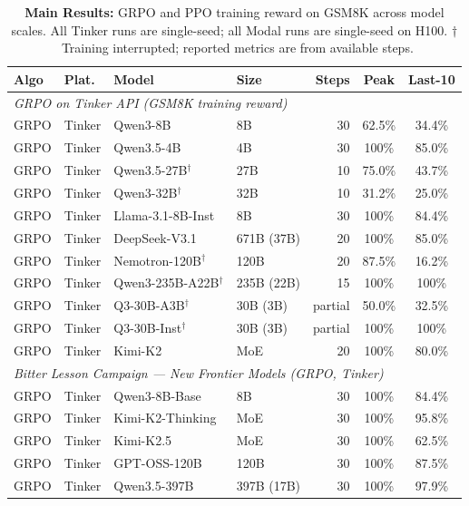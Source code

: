 \documentclass{article}
\begin{document}
\begin{table}[t]
\centering
\caption{\textbf{Main Results:} GRPO and PPO training reward on GSM8K across model scales.
All Tinker runs are single-seed; all Modal runs are single-seed on H100.
$\dagger$~Training interrupted; reported metrics are from available steps.}
\label{tab:main_results}
\scriptsize
\setlength{\tabcolsep}{3pt}
\begin{tabular}{@{}l l l l r c c@{}}
\toprule
\textbf{Algo} & \textbf{Plat.} & \textbf{Model} & \textbf{Size} & \textbf{Steps} & \textbf{Peak} & \textbf{Last-10} \\
\midrule
\multicolumn{7}{l}{\textit{GRPO on Tinker API (GSM8K training reward)}} \\
\midrule
GRPO & Tinker & Qwen3-8B & 8B & 30 & 62.5\% & 34.4\% \\
GRPO & Tinker & Qwen3.5-4B & 4B & 30 & 100\% & 85.0\% \\
GRPO & Tinker & Qwen3.5-27B$^\dagger$ & 27B & 10 & 75.0\% & 43.7\% \\
GRPO & Tinker & Qwen3-32B$^\dagger$ & 32B & 10 & 31.2\% & 25.0\% \\
GRPO & Tinker & Llama-3.1-8B-Inst & 8B & 30 & 100\% & 84.4\% \\
GRPO & Tinker & DeepSeek-V3.1 & 671B (37B) & 20 & 100\% & 85.0\% \\
GRPO & Tinker & Nemotron-120B$^\dagger$ & 120B & 20 & 87.5\% & 16.2\% \\
GRPO & Tinker & Qwen3-235B-A22B$^\dagger$ & 235B (22B) & 15 & 100\% & 100\% \\
GRPO & Tinker & Q3-30B-A3B$^\dagger$ & 30B (3B) & partial & 50.0\% & 32.5\% \\
GRPO & Tinker & Q3-30B-Inst$^\dagger$ & 30B (3B) & partial & 100\% & 100\% \\
GRPO & Tinker & Kimi-K2 & MoE & 20 & 100\% & 80.0\% \\
\midrule
\multicolumn{7}{l}{\textit{Bitter Lesson Campaign --- New Frontier Models (GRPO, Tinker)}} \\
\midrule
GRPO & Tinker & Qwen3-8B-Base & 8B & 30 & 100\% & 84.4\% \\
GRPO & Tinker & Kimi-K2-Thinking & MoE & 30 & 100\% & 95.8\% \\
GRPO & Tinker & Kimi-K2.5 & MoE & 30 & 100\% & 62.5\% \\
GRPO & Tinker & GPT-OSS-120B & 120B & 30 & 100\% & 87.5\% \\
GRPO & Tinker & Qwen3.5-397B & 397B (17B) & 30 & 100\% & 97.9\% \\

\end{tabular}
\end{table}
\end{document}

